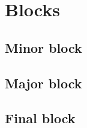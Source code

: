 \documentclass[../hydrozoa.tex]{subfiles}
\begin{document}
\section{Blocks}%
\label{h:l2-blocks}


\subsection{Minor block}%
\label{h:minor-block}




\subsection{Major block}%
\label{h:major-block}




\subsection{Final block}%
\label{h:final-block}



\end{document}
